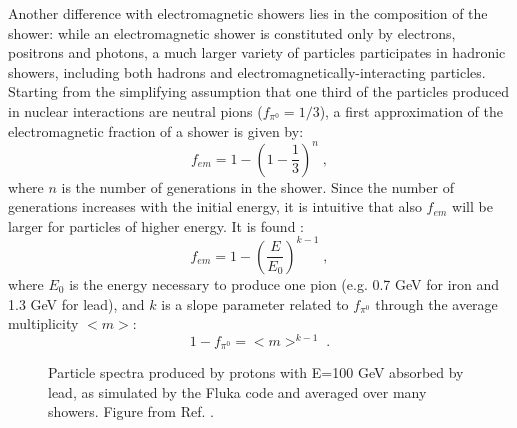 Another difference with electromagnetic showers lies in the composition of the shower: while an electromagnetic shower is constituted only by electrons, positrons and photons, a much larger variety of particles participates in hadronic showers, including both hadrons and electromagnetically-interacting particles. Starting from the simplifying assumption that one third of the particles produced in nuclear interactions are neutral pions ($f_{\pi^0}=1/3$), a first approximation of the electromagnetic fraction of a shower is given by:
\begin{equation}
f_{em} = 1 - \left(1 - \frac{1}{3} \right)^n \; ,
\end{equation}
where $n$ is the number of generations in the shower. Since the number of generations increases with the initial energy, it is intuitive that also $f_{em}$ will be larger for particles of higher energy. It is found \cite{GABRIEL1994336}:
\begin{equation}
f_{em} = 1 - \left(\frac{E}{E_0}\right)^{k-1} \; ,
\end{equation}
where $E_0$ is the energy necessary to produce one pion (e.g. 0.7 GeV for iron and 1.3 GeV for lead), and $k$ is a slope parameter related to $f_{\pi^0}$ through the average multiplicity $<m>$:
\begin{equation}
1-f_{\pi^0} = <m>^{k-1} \;.
\end{equation}


\begin{figure}[ht]
\centering
{}
\caption{Particle spectra produced by protons with E=100 GeV absorbed by lead, as simulated by the Fluka code \cite{Ferrari:898301} and averaged over many showers. Figure from Ref. \cite{RevModPhys.75.1243}.}
\label{fig:det:shower_had_spectra}
\end{figure}


